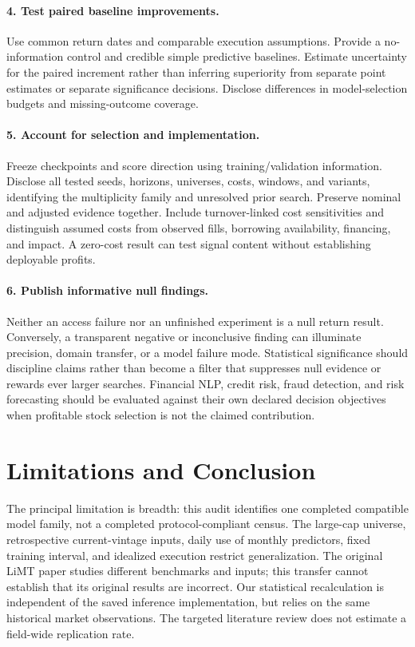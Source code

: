 \documentclass{article}
\begin{document}
\paragraph{4. Test paired baseline improvements.}
Use common return dates and comparable execution assumptions. Provide a no-information control and credible simple predictive baselines. Estimate uncertainty for the paired increment rather than inferring superiority from separate point estimates or separate significance decisions. Disclose differences in model-selection budgets and missing-outcome coverage.

\paragraph{5. Account for selection and implementation.}
Freeze checkpoints and score direction using training/validation information. Disclose all tested seeds, horizons, universes, costs, windows, and variants, identifying the multiplicity family and unresolved prior search. Preserve nominal and adjusted evidence together. Include turnover-linked cost sensitivities and distinguish assumed costs from observed fills, borrowing availability, financing, and impact. A zero-cost result can test signal content without establishing deployable profits.

\paragraph{6. Publish informative null findings.}
Neither an access failure nor an unfinished experiment is a null return result. Conversely, a transparent negative or inconclusive finding can illuminate precision, domain transfer, or a model failure mode. Statistical significance should discipline claims rather than become a filter that suppresses null evidence or rewards ever larger searches. Financial NLP, credit risk, fraud detection, and risk forecasting should be evaluated against their own declared decision objectives when profitable stock selection is not the claimed contribution.

\section{Limitations and Conclusion}
The principal limitation is breadth: this audit identifies one completed compatible model family, not a completed protocol-compliant census. The large-cap universe, retrospective current-vintage inputs, daily use of monthly predictors, fixed training interval, and idealized execution restrict generalization. The original LiMT paper studies different benchmarks and inputs; this transfer cannot establish that its original results are incorrect. Our statistical recalculation is independent of the saved inference implementation, but relies on the same historical market observations. The targeted literature review does not estimate a field-wide replication rate.
\end{document}
